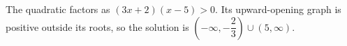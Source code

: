 The quadratic factors as $(3x+2)(x-5)>0$. Its upward-opening graph is positive outside its roots, so the solution is $\boxed{(-\infty,-\dfrac{2}{3})\cup(5,\infty)}$.
